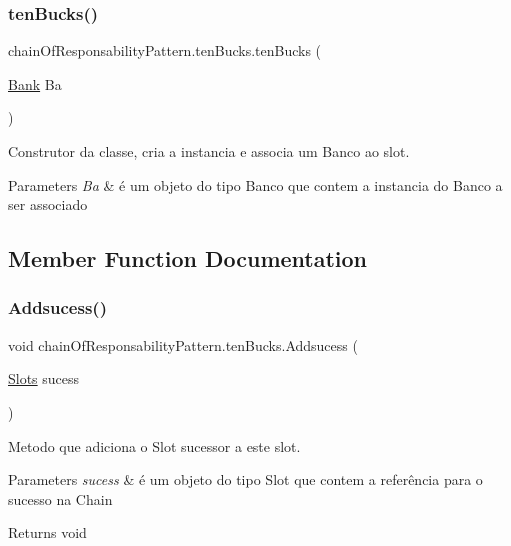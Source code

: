 \subsubsection{\texorpdfstring{tenBucks()}{tenBucks()}}
{\footnotesize\ttfamily chain\+Of\+Responsability\+Pattern.\+ten\+Bucks.\+ten\+Bucks (\begin{DoxyParamCaption}\item[{\mbox{\hyperlink{classmediator_pattern_1_1_bank}{Bank}}}]{Ba }\end{DoxyParamCaption})}



Construtor da classe, cria a instancia e associa um Banco ao slot. 


\begin{DoxyParams}{Parameters}
{\em Ba} & é um objeto do tipo Banco que contem a instancia do Banco a ser associado \\
\hline
\end{DoxyParams}


\subsection{Member Function Documentation}
\mbox{\label{classchain_of_responsability_pattern_1_1ten_bucks_aac6711a6d9d3a73c633d359f167f87cf}} 
\subsubsection{\texorpdfstring{Addsucess()}{Addsucess()}}
{\footnotesize\ttfamily void chain\+Of\+Responsability\+Pattern.\+ten\+Bucks.\+Addsucess (\begin{DoxyParamCaption}\item[{\mbox{\hyperlink{interfacechain_of_responsability_pattern_1_1_slots}{Slots}}}]{sucess }\end{DoxyParamCaption})}



Metodo que adiciona o Slot sucessor a este slot. 


\begin{DoxyParams}{Parameters}
{\em sucess} & é um objeto do tipo Slot que contem a referência para o sucesso na Chain \\
\hline
\end{DoxyParams}
\begin{DoxyReturn}{Returns}
void 
\end{DoxyReturn}
\mbox{\label{classchain_of_responsability_pattern_1_1ten_bucks_a3ab345bb0d74e82a74f185aabf382da6}} 
